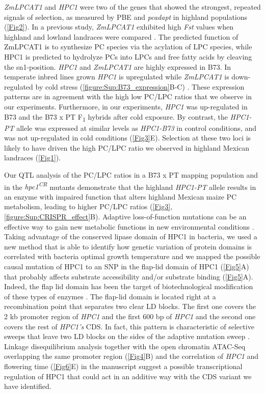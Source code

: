 \documentclass[9pt,twocolumn,twoside,lineno]{biorxiv}
\newcommand{\hpc}{\textit{HPC1}\xspace}
\begin{document}
\textit{ZmLPCAT1} and \hpc were two of the genes that showed the strongest, repeated signals of selection, as measured by PBE and \textit{pcadapt} in highland populations (\cref{Fig2}). 
In a previous study, \textit{ZmLPCAT1} exhibited high \textit{Fst} values when highland and lowland landraces were compared \cite{Takuno2015-uj}.
The predicted function of ZmLPCAT1 is to synthesize PC species via the acylation of LPC species, while HPC1 is predicted to hydrolyze PCs into LPCs and free fatty acids by cleaving the sn1-position.
\hpc and \textit{ZmLPCAT1} are highly expressed in B73. 
In temperate inbred lines grown \hpc is upregulated while \textit{ZmLPCAT1} is down-regulated by cold stress (\cref{figure:Sup:B73_expression}B-C) \cite{Waters2017-nat}.
These expression patterns are in agreement with the high low PC/LPC ratios that we observe in our experiments. 
Furthermore, in our experiments, \hpc was up-regulated in B73 and the B73 x PT F\textsubscript{1} hybrids after cold exposure. 
By contrast, the \textit{HPC1-PT} allele was expressed at similar levels as \textit{HPC1-B73} in control conditions, and was not up-regulated in cold conditions (\cref{Fig3}E).
Selection at these two loci is likely to have driven the high PC/LPC ratio we observed in highland Mexican landraces (\cref{Fig1}). 

Our QTL analysis of the PC/LPC ratios in a B73 x PT mapping population and in the \textit{hpc1\textsuperscript{CR}} mutants demonstrate that the highland \textit{HPC1-PT} allele results in an enzyme with impaired function that alters highland Mexican maize PC metabolism, leading to higher PC/LPC ratios (\cref{Fig3}, \cref{figure:Sup:CRISPR_effect}B). 
Adaptive loss-of-function mutations can be an effective way to gain new metabolic functions in new environmental conditions \cite{Hottes2013-np}.
Taking advantage of the conserved lipase domain of HPC1 in bacteria, we used a new method that is able to identify how genetic variation of protein domains is correlated with bacteria optimal growth temperature \cite{Jensen2021-iv, Jensen2021-zm} and we mapped the possible causal mutation of HPC1 to an SNP in the flap-lid domain of HPC1 (\cref{Fig5}A) that probably affects substrate  accessibility and/or substrate binding (\cref{Fig5}A). 
Indeed, the flap lid domain has been the target of biotechnological modification of these types of enzymes \cite{Khan2017-ua}.
The flap-lid domain is located right at a recombination point that separates two clear LD blocks. 
The first one covers the 2 kb promoter region of \hpc and the first 600 bp of \hpc and the second one covers the rest of \textit{HPC1's} CDS. 
In fact, this pattern is characteristic of selective sweeps that leave two LD blocks on the sides of the adaptive mutation sweep \cite{Kim2004-pa}. 
Linkage disequilibrium analysis together with the open chromatin ATAC-Seq overlapping the same promoter region (\cref{Fig4}B) and the correlation of \hpc and flowering time (\cref{Fig6}E) in the manuscript suggest a possible transcriptional regulation of HPC1 that could act in an additive way with the CDS variant we have identified.   
\end{document}
